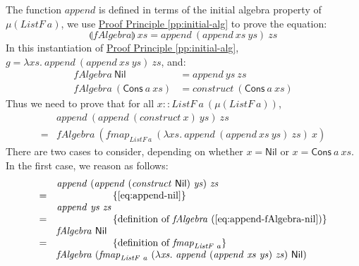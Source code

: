 \documentclass{jfp1}
\newcommand{\fold}[1]{\llparenthesis #1 \rrparenthesis}
\newcommand{\eqAnnotation}[1]{\hspace{2cm}\left\{\textrm{#1}\right\}}
\newcommand{\proofprinref}[1]{\hyperref[#1]{Proof Principle \ref*{#1}}}
\begin{document}
\begin{proof*}
  The function $\mathit{append}$ is defined in terms of the initial
  algebra property of $\mu(\mathit{ListF}~a)$, we use
  \proofprinref{pp:initial-alg} to prove the equation:
  \begin{displaymath}
    \fold{\mathit{fAlgebra}}~\mathit{xs} = \mathit{append}~(\mathit{append}~\mathit{xs}~\mathit{ys})~\mathit{zs}
  \end{displaymath}
  In this instantiation of \proofprinref{pp:initial-alg}, $g = \lambda
  \mathit{xs}.~\mathit{append}~(\mathit{append}~\mathit{xs}~\mathit{ys})~\mathit{zs}$,
  and:
  \begin{align}
    \label{eq:append-fAlgebra-nil}
    \mathit{fAlgebra}~\mathsf{Nil} &= \mathit{append}~\mathit{ys}~\mathit{zs} \\
    \label{eq:append-fAlgebra-cons}
    \mathit{fAlgebra}~(\mathsf{Cons}~a~\mathit{xs}) &= \mathit{construct}~(\mathsf{Cons}~a~\mathit{xs})
  \end{align}
  Thus we need to prove that for all $x ::
  \mathit{ListF}~a~(\mu(\mathit{ListF}~a))$,
  \begin{displaymath}
    \begin{array}{cl}
      &\mathit{append}~(\mathit{append}~(\mathit{construct}~x)~\mathit{ys})~\mathit{zs}\\
      =&\mathit{fAlgebra}~(\mathit{fmap}_{\mathit{ListF}~a}~(\lambda \mathit{xs}.~\mathit{append}~(\mathit{append}~\mathit{xs}~\mathit{ys})~\mathit{zs})~x)
    \end{array}
  \end{displaymath}
  There are two cases to consider, depending on whether $x =
  \mathsf{Nil}$ or $x = \mathsf{Cons}~a~\mathit{xs}$. In the first
  case, we reason as follows:
  \begin{displaymath}
    \begin{array}{cl}
      & \mathit{append}~(\mathit{append}~(\mathit{construct}~\mathsf{Nil})~\mathit{ys})~\mathit{zs}\\
      =&\eqAnnotation{\autoref{eq:append-nil}} \\
      & \mathit{append}~\mathit{ys}~\mathit{zs} \\
      =&\eqAnnotation{definition of $\mathit{fAlgebra}$ (\autoref{eq:append-fAlgebra-nil})} \\
      & \mathit{fAlgebra}~\mathsf{Nil} \\
      =&\eqAnnotation{definition of $\mathit{fmap}_{\mathit{ListF}~a}$} \\
      & \mathit{fAlgebra}~(\mathit{fmap}_{\mathit{ListF}~a}~(\lambda \mathit{xs}.~\mathit{append}~(\mathit{append}~\mathit{xs}~\mathit{ys})~\mathit{zs})~\mathsf{Nil})

\end{array}
\end{displaymath}
\end{proof*}
\end{document}
